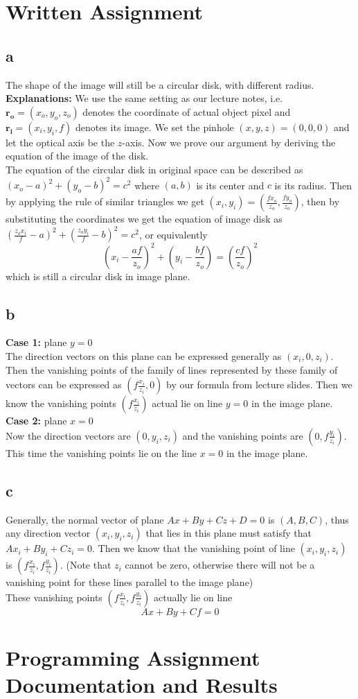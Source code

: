 \documentclass[12pt,letterpaper]{article}
\begin{document}
\section{Written Assignment}
\subsection*{a}
The shape of the image will still be a circular disk, with different radius.\\
\textbf{Explanations:}
We use the same setting as our lecture notes, i.e. $\boldsymbol{r_o}=(x_o,y_o,z_o)$ denotes
the coordinate of actual object pixel and $\boldsymbol{r_i}=(x_i,y_i,f)$ denotes its image.
We set the pinhole $(x,y,z)=(0,0,0)$ and let the optical axis be the $z$-axis.
Now we prove our argument by deriving the equation of the image of the disk.\\
The equation of the circular disk in original space can be described as $(x_o-a)^2+(y_o-b)^2=c^2$
where $(a,b)$ is its center and $c$ is its radius. Then by applying the rule of similar triangles 
we get $(x_i,y_i)=(\frac{fx_o}{z_o},\frac{fy_o}{z_o})$, then by substituting the coordinates
we get the equation of image disk as $(\frac{z_ox_i}{f}-a)^2+(\frac{z_oy_i}{f}-b)^2=c^2$,
or equivalently $$(x_i-\frac{af}{z_o})^2+(y_i-\frac{bf}{z_o})=(\frac{cf}{z_o})^2$$
which is still a circular disk in image plane.
\subsection*{b}
\textbf{Case 1:} plane $y=0$\\
The direction vectors on this plane can be expressed generally as $(x_i,0,z_i)$.
Then the vanishing points of the family of lines represented by these family of vectors
can be expressed as $(f\frac{x_i}{z_i},0)$ by our formula from lecture slides.
Then we know the vanishing points $(f\frac{x_i}{z_i})$ actual lie on line $y=0$ in the image plane.\\
\textbf{Case 2:} plane $x=0$\\
Now the direction vectors are $(0,y_i,z_i)$ and the vanishing points are $(0,f\frac{y_i}{z_i})$.
This time the vanishing points lie on the line $x=0$ in the image plane.
\subsection*{c}
Generally, the normal vector of plane $Ax+By+Cz+D=0$ is $(A,B,C)$, thus any direction vector $(x_i,y_i,z_i)$
that lies in this plane must satisfy that $Ax_i+By_i+Cz_i=0$. 
Then we know that the vanishing point of line $(x_i,y_i,z_i)$ is $(f\frac{x_i}{z_i},f\frac{y_i}{z_i})$.
(Note that $z_i$ cannot be zero, otherwise there will not be a vanishing point for these lines parallel to the image plane)\\
These vanishing points $(f\frac{x_i}{z_i},f\frac{y_i}{z_i})$ actually lie on line
$$Ax+By+Cf=0$$

\newpage
\section{Programming Assignment Documentation and Results}
\end{document}
